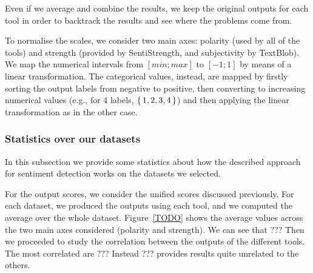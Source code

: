 

Even if we average and combine the results, we keep the original outputs for each tool in order to backtrack the results and see where the problems come from.

To normalise the scales, we consider two main axes: polarity (used by all of the tools) and strength (provided by SentiStrength, and subjectivity by TextBlob). We map the numerical intervals from $[min;max]$ to $[-1;1]$ by means of a linear transformation. The categorical values, instead, are mapped by firstly sorting the output labels from negative to positive, then converting to increasing numerical values (e.g., for 4 labels, $\set{1,2,3,4}$) and then applying the linear transformation as in the other case.

\subsubsection{\statusred Statistics over our datasets}
In this subsection we provide some statistics about how the described approach for sentiment detection works on the datasets we selected.


For the output scores, we consider the unified scores discussed previously. For each dataset, we produced the outputs using each tool, and we computed the average over the whole dataset.
Figure~\ref{TODO} shows the average values across the two main axes considered (polarity and strength). We can see that ???
Then we proceeded to study the correlation between the outputs of the different tools.
The most correlated are ???
Instead ??? provides results quite unrelated to the others.

